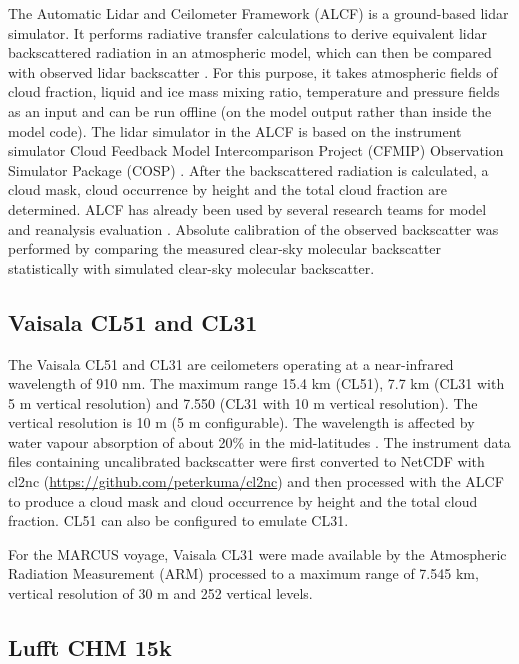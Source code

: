 \documentclass[12pt,a4paper]{article}
\begin{document}
The Automatic Lidar and Ceilometer Framework (ALCF) is a ground-based lidar
simulator. It performs radiative transfer calculations to derive equivalent
lidar backscattered radiation in an atmospheric model, which can then
be compared with observed lidar backscatter \citep{kuma2021}. For this purpose,
it takes atmospheric fields of cloud fraction, liquid and ice mass mixing ratio,
temperature and pressure fields as an input and can be run offline (on the
model output rather than inside the model code). The lidar simulator in the
ALCF is based on the instrument simulator Cloud Feedback Model
Intercomparison Project (CFMIP) Observation Simulator Package (COSP)
\citep{bodas-salcedo2011}. After the backscattered radiation is calculated, a
cloud mask, cloud occurrence by height and the total cloud fraction are
determined. ALCF has already been used by several research teams for model and
reanalysis evaluation
\citep{kuma2020,kremser2021,guyot2022,pei2023,whitehead2023,mcdonald2024}.
Absolute calibration of the observed backscatter was performed by comparing
the measured clear-sky molecular backscatter statistically with simulated
clear-sky molecular backscatter.

\subsection{Vaisala CL51 and CL31}
\label{sec:cl51}

The Vaisala CL51 and CL31 are ceilometers operating at a near-infrared
wavelength of 910 nm. The maximum range 15.4 km (CL51), 7.7 km (CL31 with 5 m
vertical resolution) and 7.550 (CL31 with 10 m vertical resolution).
The vertical resolution is 10 m (5 m configurable). The wavelength is affected
by water vapour absorption of about 20\% in the mid-latitudes
\citep{wiegner2015,wiegner2019}.  The instrument data files containing
uncalibrated backscatter were first converted to NetCDF with cl2nc
(\url{https://github.com/peterkuma/cl2nc}) and then processed with the ALCF to
produce a cloud mask and cloud occurrence by height and the total cloud
fraction. CL51 can also be configured to emulate CL31.

For the MARCUS voyage, Vaisala CL31 were made available by the Atmospheric
Radiation Measurement (ARM) processed to a maximum range of 7.545 km, vertical
resolution of 30 m and 252 vertical levels.

\subsection{Lufft CHM 15k}
\label{sec:chm15k}
\end{document}
